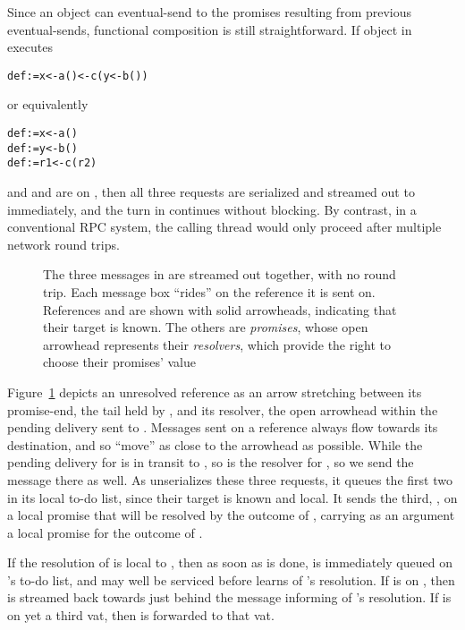 \documentclass{llncs}
\begin{document}
Since an object can eventual-send to the promises resulting from
previous eventual-sends, functional composition is still
straightforward. If object  in  executes
%
\begin{alltt}
    def  := x <- a() <- c(y <- b())
\end{alltt}
%
or equivalently
%
\begin{alltt}
    def  := x <- a()
    def  := y <- b()
    def  := r1 <- c(r2)
\end{alltt}
%
and  and  are on , then all three requests are
serialized and streamed out to  immediately, and the turn in
 continues without blocking. By contrast, in a conventional RPC
system, the calling thread would only proceed after multiple network
round trips.

\begin{figure}
\centerline{}
\caption{The three messages in  are streamed out together, with no round
trip. Each message box ``rides'' on the reference it is sent
on. References  and  are shown with solid arrowheads,
indicating that their target is known. The others are \emph{promises},
whose open arrowhead represents their \emph{resolvers}, which provide
the right to choose their promises' value}
\label{fig:pipeline}
\end{figure}

Figure~\ref{fig:pipeline} depicts an unresolved reference as an arrow
stretching between its promise-end, the tail held by , and its
resolver, the open arrowhead within the pending delivery sent to
. Messages sent on a reference always flow towards its
destination, and so ``move'' as close to the arrowhead as
possible. While the pending delivery for  is in transit to
, so is the resolver for , so we send the 
message there as well. As  unserializes these three requests,
it queues the first two in its local to-do list, since their target is
known and local. It sends the third, , on a local
promise that will be resolved by the outcome of , carrying
as an argument a local promise for the outcome of .

If the resolution of  is local to , then as soon as
 is done,  is immediately queued on 's
to-do list, and may well be serviced before  learns of
's resolution. If  is on , then  is
streamed back towards  just behind the message informing
 of 's resolution.  If  is on yet a third vat,
then  is forwarded to that vat.
\end{document}
